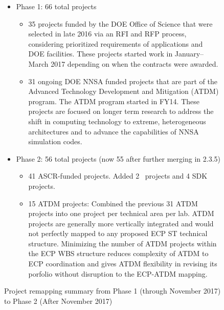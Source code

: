 \begin{figure}
\begin{mdframed}
\begin{itemize}
\item Phase 1: 66 total projects
\begin{itemize}
\item 35 projects funded by the DOE Office of Science that were selected in late 2016 via an RFI and RFP process, considering prioritized requirements of applications and DOE facilities. 
These projects started work in January–March 2017 depending on when the contracts were awarded.
\item 31 ongoing DOE NNSA funded projects that are part of the Advanced Technology Development and Mitigation (ATDM) program. The ATDM program started in FY14.  These projects are focused on longer term research to address the shift in computing technology to extreme, heterogeneous architectures and to advance the capabilities of NNSA simulation codes.
\end{itemize}
\item Phase 2: 56 total projects
(now 55 after further merging in 2.3.5)
\begin{itemize}
\item 41 ASCR-funded projects.  Added  2 \ecosystem\ projects and 4 SDK projects.
\item 15 ATDM projects: Combined the previous 31 ATDM projects into one project per technical area per lab.  ATDM projects are generally more vertically integrated and would not perfectly mapped to any proposed ECP ST technical structure.  Minimizing the number of ATDM projects within the ECP WBS structure reduces complexity of ATDM to ECP coordination and gives ATDM flexibility in revising its porfolio without disruption to the ECP-ATDM mapping.
\end{itemize}
\end{itemize}
\end{mdframed}

\caption{\label{fig:project-remapping}Project remapping summary from Phase 1 (through November 2017) to Phase 2 (After November 2017)}
\end{figure}


